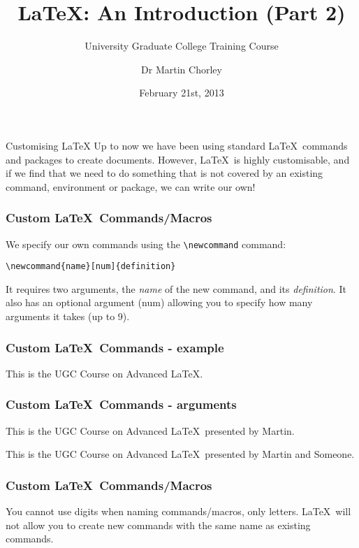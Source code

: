 \documentclass[mathserif]{beamer}
\title{\LaTeX: An Introduction (Part 2)}
\subtitle{University Graduate College Training Course}
\author[Martin Chorley]{Dr Martin Chorley}
\institute[COMSC]{School of Computer Science \& Informatics, Cardiff University}
\date[21/02/13]{February 21st, 2013}
\begin{document}
\begin{frame}{Customising \LaTeX}
\vfill
Up to now we have been using standard \LaTeX\ commands and packages to create documents.
\vfill
However, \LaTeX\ is highly customisable, and if we find that we need to do something that is not covered by an existing command, environment or package, we can write our own!
\vfill
\end{frame}


\begin{frame}[fragile]
\frametitle{Custom \LaTeX\ Commands/Macros}
\vfill
We specify our own commands using the \texttt{{\textbackslash}newcommand} command:
\vfill
\begin{lstlisting}[style=latexsty]
\newcommand{name}[num]{definition}
\end{lstlisting}
\vfill
It requires two arguments, the \emph{name} of the new command, and its \emph{definition}. It also has an optional argument (\emph{}num) allowing you to specify how many arguments it takes (up to 9).
\vfill
\end{frame}

\begin{frame}[fragile]
\frametitle{Custom \LaTeX\ Commands - example}
\vfill
\begin{LTXexample}[style=latexsty]
\newcommand{\ual}{UGC Course on Advanced \LaTeX}

This is the \ual. 
\end{LTXexample}
\vfill
\end{frame}


\begin{frame}[fragile]
\frametitle{Custom \LaTeX\ Commands - arguments}
\vfill
\begin{LTXexample}[style=latexsty]
\newcommand{\ualarg}[1]{UGC Course on Advanced \LaTeX\, presented by #1}
\newcommand{\ualargtwo}[2]{UGC Course on Advanced \LaTeX\, presented by #1 and #2}

This is the \ualarg{Martin}.

This is the \ualargtwo{Martin}{Someone}. 
\end{LTXexample}
\vfill
\end{frame}

\begin{frame}[fragile]
\frametitle{Custom \LaTeX\ Commands/Macros}
\vfill
You cannot use digits when naming commands/macros, only letters.
\vfill
\LaTeX\ will not allow you to create new commands with the same name as existing commands.
\vfill
\end{frame}
\end{document}
